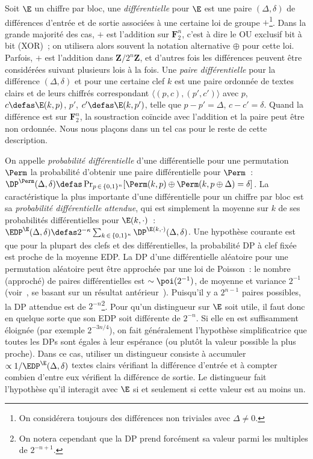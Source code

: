 Soit $\E$ un chiffre par bloc, une \emph{différentielle} pour $\E$ est une paire
$(\Delta,\delta)$ de différences d'entrée et de sortie associées à une certaine loi de groupe
$+$\footnote{On considérera toujours des différences non triviales avec $\Delta \neq 0$.}.
Dans la grande majorité des cas, $+$ est l'addition sur $\mathbf{F}_2^n$,
c'est à dire le OU exclusif bit à bit (XOR)~; on utilisera alors souvent la notation alternative $\oplus$ pour cette loi.
Parfois, $+$ est l'addition dans $\mathbf{Z}/2^n\mathbf{Z}$, et d'autres fois les différences peuvent être considérées suivant plusieurs lois à la fois.
Une \emph{paire différentielle} pour la différence $(\Delta,\delta)$ et pour une certaine clef $k$
est une paire ordonnée de textes clairs et de leurs chiffrés correspondant $\langle (p,c), (p',c')\rangle$ avec 
$p$, $c \defas \E(k,p)$, $p'$, $c' \defas \E(k,p')$, telle que $p - p' = \Delta$, $c - c' = \delta$. Quand la différence est sur $\mathbf{F}_2^n$,
la soustraction coïncide avec l'addition et la paire peut être non ordonnée. Nous nous plaçons dans un tel cas pour le reste de cette description.

On appelle \emph{probabilité différentielle} d'une différentielle pour une permutation $\Perm$ la probabilité d'obtenir une
paire différentielle pour $\Perm$~:
$\DP^{\Perm}(\Delta,\delta) \defas \Pr_{p\,\in\,\{0,1\}^n}[\Perm(k,p) \oplus \Perm(k,p \oplus \Delta) = \delta]$.
La caractéristique la plus importante d'une différentielle pour un chiffre par bloc est sa \emph{probabilité différentielle attendue},
qui est simplement la moyenne sur $k$ de ses probabilités différentielles pour $\E(k,\cdot)$~:
$\EDP^{\E}(\Delta,\delta) \defas 2^{-\kappa}\sum_{k\,\in\,\{0,1\}^\kappa} \DP^{\E(k,\cdot)}(\Delta,\delta)$.
Une hypothèse courante est que pour la plupart des clefs et des différentielles, la probabilité DP à clef fixée
est proche de la moyenne EDP.
La DP d'une différentielle aléatoire pour une permutation aléatoire peut être approchée par une loi de Poisson~:
le nombre (approché) de paires différentielles est
$\sim \poi(2^{-1})$, de moyenne et variance $2^{-1}$
(voir~\cite{DBLP:journals/jmc/DaemenR07}, se basant sur un résultat antérieur~\cite{DBLP:journals/joc/OConnor95}).
Puisqu'il y a
$2^{n-1}$ paires possibles, la DP attendue est de $2^{-n}$\footnote{On notera cependant que la DP prend forcément sa valeur parmi les multiples de $2^{-n+1}$.}.
Pour qu'un distingueur sur $\E$ soit utile, il faut donc en quelque sorte que son EDP soit différente de $2^{-n}$. Si elle en est suffisamment éloignée
(par exemple $2^{-3n/4}$), on fait généralement l'hypothèse simplificatrice que toutes les DPs sont égales à leur espérance (ou plutôt la valeur
possible la plus proche).
Dans ce cas,
utiliser un distingueur consiste à accumuler
$\propto 1/\EDP^{\E}(\Delta,\delta)$ textes clairs vérifiant la différence d'entrée et à compter combien d'entre eux vérifient la différence de sortie.
Le distingueur fait l'hypothèse qu'il
interagit avec $\E$ si et seulement si cette valeur est au moins un.

